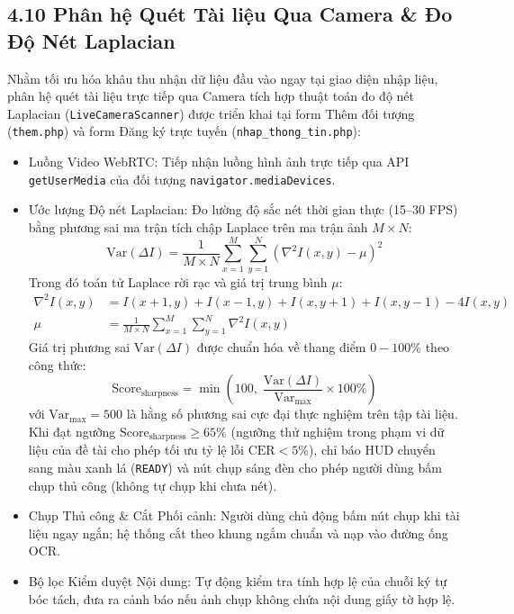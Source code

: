 \documentclass[12pt,a4paper]{report}
\begin{document}
\subsection*{4.10 Phân hệ Quét Tài liệu Qua Camera \& Đo Độ Nét Laplacian}
Nhằm tối ưu hóa khâu thu nhận dữ liệu đầu vào ngay tại giao diện nhập liệu, phân hệ quét tài liệu trực tiếp qua Camera tích hợp thuật toán đo độ nét Laplacian (\texttt{LiveCameraScanner}) được triển khai tại form Thêm đối tượng (\texttt{them.php}) và form Đăng ký trực tuyến (\texttt{nhap\_\allowbreak thong\_\allowbreak tin.php}):
\begin{itemize}[label=--,leftmargin=*]
  \item Luồng Video WebRTC: Tiếp nhận luồng hình ảnh trực tiếp qua API \texttt{getUserMedia} của đối tượng \texttt{navigator.mediaDevices}.
  \item Ước lượng Độ nét Laplacian: Đo lường độ sắc nét thời gian thực (15--30 FPS) bằng phương sai ma trận tích chập Laplace trên ma trận ảnh $M \times N$:
        \begin{equation}
          \text{Var}(\Delta I) = \frac{1}{M \times N} \sum_{x=1}^{M} \sum_{y=1}^{N} \left( \nabla^2 I(x,y) - \mu \right)^2
        \end{equation}
        Trong đó toán tử Laplace rời rạc và giá trị trung bình $\mu$:
        \begin{equation}
          \begin{aligned}
            \nabla^2 I(x,y) & = I(x+1,y) + I(x-1,y) + I(x,y+1) + I(x,y-1) - 4I(x,y)             \\
            \mu             & = \frac{1}{M \times N}\sum_{x=1}^{M}\sum_{y=1}^{N}\nabla^2 I(x,y)
          \end{aligned}
        \end{equation}
        Giá trị phương sai $\text{Var}(\Delta I)$ được chuẩn hóa về thang điểm $0 - 100\%$ theo công thức:
        \begin{equation}
          \text{Score}_{\text{sharpness}} = \min\left(100, \; \frac{\text{Var}(\Delta I)}{\text{Var}_{\text{max}}} \times 100\%\right)
        \end{equation}
        với $\text{Var}_{\text{max}} = 500$ là hằng số phương sai cực đại thực nghiệm trên tập tài liệu. Khi đạt ngưỡng $\text{Score}_{\text{sharpness}} \ge 65\%$ (ngưỡng thử nghiệm trong phạm vi dữ liệu của đề tài cho phép tối ưu tỷ lệ lỗi $\text{CER} < 5\%$), chỉ báo HUD chuyển sang màu xanh lá (\texttt{READY}) và nút chụp sáng đèn cho phép người dùng bấm chụp thủ công (không tự chụp khi chưa nét).
  \item Chụp Thủ công \& Cắt Phối cảnh: Người dùng chủ động bấm nút chụp khi tài liệu ngay ngắn; hệ thống cắt theo khung ngắm chuẩn và nạp vào đường ống OCR.
  \item Bộ lọc Kiểm duyệt Nội dung: Tự động kiểm tra tính hợp lệ của chuỗi ký tự bóc tách, đưa ra cảnh báo nếu ảnh chụp không chứa nội dung giấy tờ hợp lệ.
\end{itemize}
\end{document}
